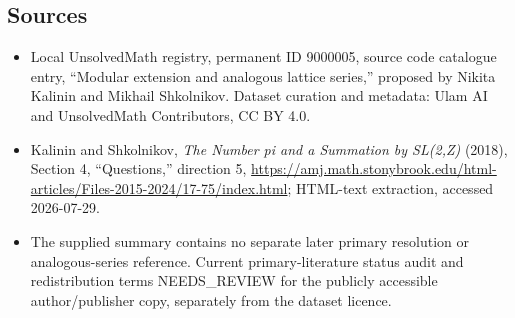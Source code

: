 \documentclass[11pt]{article}
\begin{document}
\subsection{Sources}
\begin{itemize}
\item Local UnsolvedMath registry, permanent ID 9000005, source code catalogue entry, ``Modular extension and analogous lattice series,'' proposed by Nikita Kalinin and Mikhail Shkolnikov. Dataset curation and metadata: Ulam AI and UnsolvedMath Contributors, CC BY 4.0.
\item Kalinin and Shkolnikov, \emph{The Number pi and a Summation by SL(2,Z)} (2018), Section 4, ``Questions,'' direction 5, \url{https://amj.math.stonybrook.edu/html-articles/Files-2015-2024/17-75/index.html}; HTML-text extraction, accessed 2026-07-29.
\item The supplied summary contains no separate later primary resolution or analogous-series reference. Current primary-literature status audit and redistribution terms NEEDS\_REVIEW for the publicly accessible author/publisher copy, separately from the dataset licence.
\end{itemize}
\end{document}
